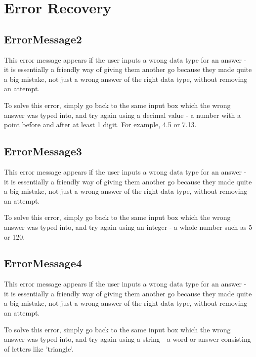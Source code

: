 \section{Error Recovery}

\subsection{ErrorMessage2}

This error message appears if the user inputs a wrong data type for an answer - it is essentially a friendly way of giving them another go because they made quite a big mistake, not just a wrong answer of the right data type, without removing an attempt.


To solve this error, simply go back to the same input box which the wrong answer was typed into, and try again using a decimal value - a number with a point before and after at least 1 digit. For example, 4.5 or 7.13.

\subsection{ErrorMessage3}

This error message appears if the user inputs a wrong data type for an answer - it is essentially a friendly way of giving them another go because they made quite a big mistake, not just a wrong answer of the right data type, without removing an attempt.


To solve this error, simply go back to the same input box which the wrong answer was typed into, and try again using an integer - a whole number such as 5 or 120.

\subsection{ErrorMessage4}

This error message appears if the user inputs a wrong data type for an answer - it is essentially a friendly way of giving them another go because they made quite a big mistake, not just a wrong answer of the right data type, without removing an attempt.


To solve this error, simply go back to the same input box which the wrong answer was typed into, and try again using a string - a word or answer consisting of letters like 'triangle'.

